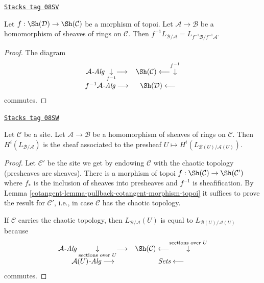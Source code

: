 \begin{lemma}
\label{cotangent-lemma-pullback-cotangent-morphism-topoi}
\href{https://stacks.math.columbia.edu/tag/08SV}{\texttt{Stacks tag 08SV}}

Let $f : \Sh(\mathcal{D}) \to \Sh(\mathcal{C})$ be a morphism of topoi.
Let $\mathcal{A} \to \mathcal{B}$ be a homomorphism of sheaves of rings
on $\mathcal{C}$. Then
$f^{-1}L_{\mathcal{B}/\mathcal{A}} = L_{f^{-1}\mathcal{B}/f^{-1}\mathcal{A}}$.
\end{lemma}

\begin{proof}
The diagram
$$
\begin{array}{cc}\mathcal{A}\textit{-Alg} \underset{f^{-1}}{\downarrow}\longrightarrow & \Sh(\mathcal{C}) \longleftarrow\overset{f^{-1}}{\downarrow} \\ f^{-1}\mathcal{A}\textit{-Alg} \longrightarrow & \Sh(\mathcal{D}) \longleftarrow\end{array}
$$
commutes.
\end{proof}

\begin{lemma}
\label{cotangent-lemma-compute-L-morphism-sheaves-rings}
\href{https://stacks.math.columbia.edu/tag/08SW}{\texttt{Stacks tag 08SW}}

Let $\mathcal{C}$ be a site. Let $\mathcal{A} \to \mathcal{B}$ be a
homomorphism of sheaves of rings on $\mathcal{C}$. Then
$H^i(L_{\mathcal{B}/\mathcal{A}})$ is the sheaf associated to the
presheaf $U \mapsto H^i(L_{\mathcal{B}(U)/\mathcal{A}(U)})$.
\end{lemma}

\begin{proof}

Let $\mathcal{C}'$ be the site we get by endowing $\mathcal{C}$ with the
chaotic topology (presheaves are sheaves). There is a morphism of topoi
$f : \Sh(\mathcal{C}) \to \Sh(\mathcal{C}')$ where $f_*$ is the inclusion
of sheaves into presheaves and $f^{-1}$ is sheafification.
By Lemma \ref{cotangent-lemma-pullback-cotangent-morphism-topoi}
it suffices to prove the result for $\mathcal{C}'$, i.e.,
in case $\mathcal{C}$ has the chaotic topology.

\medskip\noindent
If $\mathcal{C}$ carries the chaotic topology, then
$L_{\mathcal{B}/\mathcal{A}}(U)$ is equal to
$L_{\mathcal{B}(U)/\mathcal{A}(U)}$ because
$$
\begin{array}{cc}\mathcal{A}\textit{-Alg} \underset{\text{sections over }U}{\downarrow}\longrightarrow & \Sh(\mathcal{C}) \longleftarrow\overset{\text{sections over }U}{\downarrow} \\ \mathcal{A}(U)\textit{-Alg} \longrightarrow & \textit{Sets} \longleftarrow\end{array}
$$
commutes.
\end{proof}

